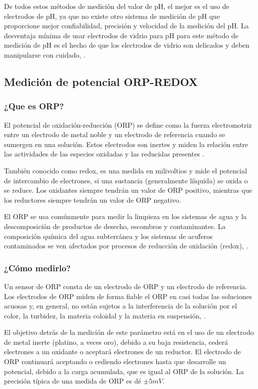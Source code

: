 De todos estos métodos de medición del valor de pH,  el mejor es el uso de electrodos de pH, ya que no existe otro sistema de medición de pH que proporcione mejor confiabilidad, precisión y velocidad de la medición del pH. 
La desventaja mínima de usar electrodos de vidrio para pH para este m\'etodo de medici\'on de pH es el hecho de que los electrodos de vidrio son delicados y deben manipularse con cuidado, \cite{li_chapter_2019}.

\subsection{Medición de potencial ORP-REDOX}
\subsubsection{¿Que es ORP?}
El potencial de oxidaci\'on-reducci\'on (ORP) se define como la fuerza electromotriz entre un electrodo de metal noble y un electrodo de referencia cuando se sumergen en una soluci\'on. Estos electrodos son inertes y miden la relaci\'on entre las actividades de las especies oxidadas y las reducidas presentes \cite{d19_committee_test_nodate}.

Tambi\'en conocido como redox, es una medida en milivoltios y mide el potencial de intercambio de electrones, si una sustancia (generalmente l\'iiquida) se oxida o se reduce. 
Los oxidantes siempre tendrán un valor de ORP positivo, mientras que los reductores siempre tendrán un valor de ORP negativo. 

El ORP se usa com\'unmente para medir la limpieza en los sistemas de agua y la descomposici\'on de productos de desecho, escombros y contaminantes. 
La composici\'on química del agua subterránea y los sistemas de acu\'feros contaminados se ven afectados por procesos de reducción de oxidación (redox), \cite{wator_redox_2020}.

\subsubsection{¿Cómo medirlo?}
Un sensor de ORP consta de un electrodo de ORP y un electrodo de referencia.
Los electrodos de ORP miden de forma fiable el ORP en casi todas las soluciones acuosas y, en general, no están sujetos a la interferencia de la solución por el color, la turbidez, la materia coloidal y la materia en suspensión, \cite{d19_committee_test_nodate}.

El objetivo detrás de la medición de este parámetro está en el uso de un electrodo de metal inerte (platino, a veces oro), debido a su baja resistencia, ceder\'a electrones a un oxidante o aceptar\'a electrones de un reductor. 
El electrodo de ORP continuará aceptando o cediendo electrones hasta que desarrolle un potencial, debido a la carga acumulada, que es igual al ORP de la soluci\'on. La precisión t\'ipica de una medida de ORP es d\'e \( \pm5 mV\).

